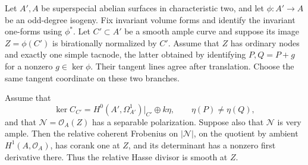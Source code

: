 \begin{lemma}
\label{lem:ss-mixed-self-tacnode}
Let $A',A$ be superspecial abelian surfaces in characteristic two,
and let $\phi:A'\to A$ be an odd-degree isogeny. Fix invariant volume
forms and identify the invariant one-forms using $\phi^*$.
Let $C'\subset A'$ be a smooth ample curve and suppose its image
$Z=\phi(C')$ is birationally normalized by $C'$. Assume that $Z$ has
ordinary nodes and exactly one simple tacnode, the latter obtained
by identifying $P,Q=P+g$ for a nonzero $g\in\ker\phi$.
Their tangent lines agree after translation. Choose the same tangent
coordinate on these two branches.

Assume that
\[
 \ker C_{C'}=
       H^0(A',\Omega^1_{A'})|_{C'}\oplus k\eta,
       \qquad \eta(P)\ne\eta(Q),
\]
and that $\mathcal N=\mathcal O_A(Z)$ has a separable polarization.
Suppose also that $\mathcal N$ is very ample. Then the relative
coherent Frobenius on $|\mathcal N|$, on the quotient by ambient
$H^1(A,\mathcal O_A)$, has corank one at $Z$, and its determinant
has a nonzero first derivative there. Thus the relative Hasse divisor
is smooth at $Z$.
\end{lemma}
